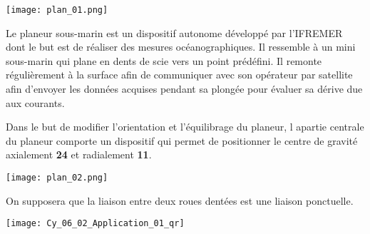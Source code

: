 
\begin{marginfigure}
\texttt{[image: plan\_01.png]}
\end{marginfigure}

Le planeur sous-marin est un dispositif autonome développé par l'IFREMER dont le but est de réaliser des mesures océanographiques. Il ressemble à un mini sous-marin qui plane en dents de scie vers un point prédéfini. Il remonte régulièrement à la surface afin de communiquer avec son opérateur par satellite afin d'envoyer les données acquises pendant sa plongée pour évaluer sa dérive due aux courants. 


Dans le but de modifier l'orientation et l'équilibrage du planeur, l apartie centrale du planeur comporte un dispositif qui permet de positionner le centre de gravité axialement \textbf{24} et radialement \textbf{11}. 


\begin{center}
\texttt{[image: plan\_02.png]}
\end{center}


\ifprof
\begin{corrige}
\end{corrige}\else\fi

On supposera que la liaison entre deux roues dentées est une liaison ponctuelle. 

\ifprof
\else
\begin{marginfigure}
\centering
\texttt{[image: Cy\_06\_02\_Application\_01\_qr]}
\end{marginfigure}
\fi


\ifprof
\begin{corrige}
\end{corrige}\else\fi


